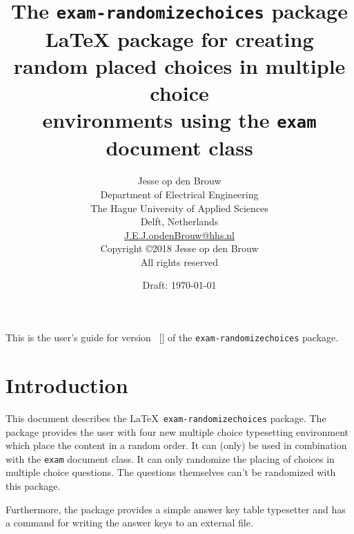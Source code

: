 \documentclass[12pt,a4paper]{exam}
\newcommand{\styversion}{\fileversion}
\newcommand{\stydate}{\filedate}
\newcommand{\docdate}{Draft: \today}
\begin{document}

\title{The \texttt{exam-randomizechoices} package\\[2ex]\normalsize LaTeX package for creating random placed choices in multiple choice \\environments using the \texttt{exam} document class}

\author{Jesse op den Brouw\\
  Department of Electrical Engineering\\
  The Hague University of Applied Sciences\\
  Delft, Netherlands\\
  \href{mailto:J.E.J.opdenBrouw@hhs.nl}{J.E.J.opdenBrouw@hhs.nl}\\[\bigskipamount]
  Copyright \copyright 2018 Jesse op den Brouw\\
  All rights reserved}

\date{\docdate}

\maketitle

\thispagestyle{empty}

\vspace*{2cm}

\begin{center}
  \small
  This is the user's guide for version~\styversion{} [\stydate] of the
  \verb|exam-randomizechoices| package. 
\end{center}

\clearpage
\tableofcontents

\clearpage


\section{Introduction}
This document describes the \LaTeX\ \texttt{exam-randomizechoices} package.
The package provides the user with four new multiple choice typesetting
environment which place the content in a random order. It can (only) be used
in combination with the \texttt{exam} document class. It can only
randomize the placing of choices in multiple choice questions. The questions
themselves can't be randomized with this package.

Furthermore, the package provides a simple answer key table typesetter and has
a command for writing the answer keys to an external file.
\end{document}
